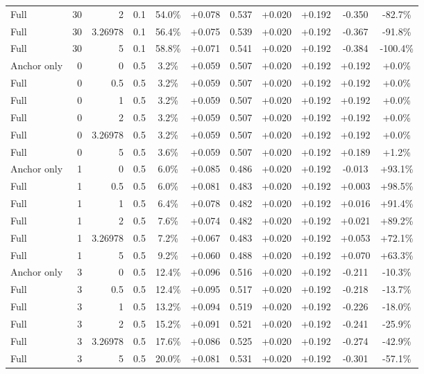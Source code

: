\begin{table}[htbp]
\begin{tabular}{lrrrccccccc}
Full & 30 & 2 & 0.1 & 54.0\% & +0.078 & 0.537 & +0.020 & +0.192 & -0.350 & -82.7\% \\
Full & 30 & 3.26978 & 0.1 & 56.4\% & +0.075 & 0.539 & +0.020 & +0.192 & -0.367 & -91.8\% \\
Full & 30 & 5 & 0.1 & 58.8\% & +0.071 & 0.541 & +0.020 & +0.192 & -0.384 & -100.4\% \\
Anchor only & 0 & 0 & 0.5 & 3.2\% & +0.059 & 0.507 & +0.020 & +0.192 & +0.192 & +0.0\% \\
Full & 0 & 0.5 & 0.5 & 3.2\% & +0.059 & 0.507 & +0.020 & +0.192 & +0.192 & +0.0\% \\
Full & 0 & 1 & 0.5 & 3.2\% & +0.059 & 0.507 & +0.020 & +0.192 & +0.192 & +0.0\% \\
Full & 0 & 2 & 0.5 & 3.2\% & +0.059 & 0.507 & +0.020 & +0.192 & +0.192 & +0.0\% \\
Full & 0 & 3.26978 & 0.5 & 3.2\% & +0.059 & 0.507 & +0.020 & +0.192 & +0.192 & +0.0\% \\
Full & 0 & 5 & 0.5 & 3.6\% & +0.059 & 0.507 & +0.020 & +0.192 & +0.189 & +1.2\% \\
Anchor only & 1 & 0 & 0.5 & 6.0\% & +0.085 & 0.486 & +0.020 & +0.192 & -0.013 & +93.1\% \\
Full & 1 & 0.5 & 0.5 & 6.0\% & +0.081 & 0.483 & +0.020 & +0.192 & +0.003 & +98.5\% \\
Full & 1 & 1 & 0.5 & 6.4\% & +0.078 & 0.482 & +0.020 & +0.192 & +0.016 & +91.4\% \\
Full & 1 & 2 & 0.5 & 7.6\% & +0.074 & 0.482 & +0.020 & +0.192 & +0.021 & +89.2\% \\
Full & 1 & 3.26978 & 0.5 & 7.2\% & +0.067 & 0.483 & +0.020 & +0.192 & +0.053 & +72.1\% \\
Full & 1 & 5 & 0.5 & 9.2\% & +0.060 & 0.488 & +0.020 & +0.192 & +0.070 & +63.3\% \\
Anchor only & 3 & 0 & 0.5 & 12.4\% & +0.096 & 0.516 & +0.020 & +0.192 & -0.211 & -10.3\% \\
Full & 3 & 0.5 & 0.5 & 12.4\% & +0.095 & 0.517 & +0.020 & +0.192 & -0.218 & -13.7\% \\
Full & 3 & 1 & 0.5 & 13.2\% & +0.094 & 0.519 & +0.020 & +0.192 & -0.226 & -18.0\% \\
Full & 3 & 2 & 0.5 & 15.2\% & +0.091 & 0.521 & +0.020 & +0.192 & -0.241 & -25.9\% \\
Full & 3 & 3.26978 & 0.5 & 17.6\% & +0.086 & 0.525 & +0.020 & +0.192 & -0.274 & -42.9\% \\
Full & 3 & 5 & 0.5 & 20.0\% & +0.081 & 0.531 & +0.020 & +0.192 & -0.301 & -57.1\% \\

\end{tabular}
\end{table}
